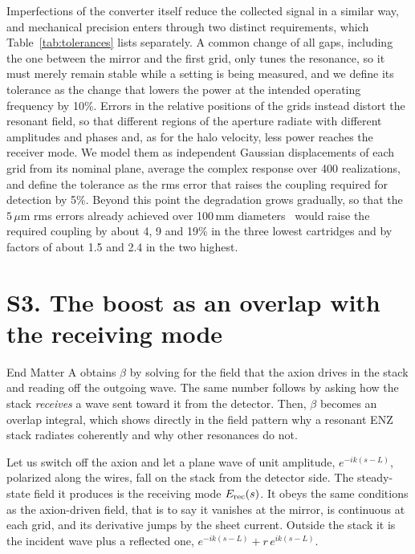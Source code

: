 \documentclass[
  aps,prl,reprint,superscriptaddress,
  amsmath,amssymb,floatfix,nofootinbib
]{revtex4-2}
\begin{document}
Imperfections of the converter itself reduce the collected signal in a similar way, and mechanical precision enters through two distinct requirements, which Table~\ref{tab:tolerances} lists separately. A common change of all gaps, including the one between the mirror and the first grid, only tunes the resonance, so it must merely remain stable while a setting is being measured, and we define its tolerance as the change that lowers the power at the intended operating frequency by 10\%. Errors in the relative positions of the grids instead distort the resonant field, so that different regions of the aperture radiate with different amplitudes and phases and, as for the halo velocity, less power reaches the receiver mode. We model them as independent Gaussian displacements of each grid from its nominal plane, average the complex response over 400 realizations, and define the tolerance as the rms error that raises the coupling required for detection by 5\%. Beyond this point the degradation grows gradually, so that the $5\,\mu$m rms errors already achieved over 100\,mm diameters~\cite{Nagler:2015xta} would raise the required coupling by about 4, 9 and 19\% in the three lowest cartridges and by factors of about 1.5 and 2.4 in the two highest.

\section*{S3. The boost as an overlap with the receiving mode}

End Matter A obtains $\beta$ by solving for the field that the axion drives in the stack and reading off the outgoing wave. The same number follows by asking how the stack \emph{receives} a wave sent toward it from the detector. Then, $\beta$ becomes an overlap integral, which shows directly in the field pattern why a resonant ENZ stack radiates coherently and why other resonances do not.

Let us switch off the axion and let a plane wave of unit amplitude, $e^{-ik(s-L)}$, polarized along the wires, fall on the stack from the detector side. The steady-state field it produces is the receiving mode $E_{\rm rec}(s)$. It obeys the same conditions as the axion-driven field, that is to say it vanishes at the mirror, is continuous at each grid, and its derivative jumps by the sheet current. Outside the stack it is the incident wave plus a reflected one, $e^{-ik(s-L)}+r\,e^{ik(s-L)}$.
\end{document}
